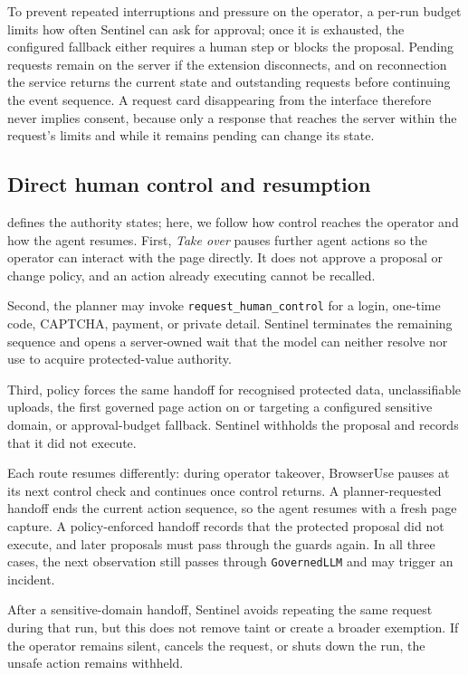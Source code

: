 To prevent repeated interruptions and pressure on the operator, a per-run
budget limits how often Sentinel can ask for approval; once it is exhausted,
the configured fallback either requires a human step or blocks the proposal.
Pending requests remain on the server if the extension disconnects, and on
reconnection the service returns
the current state and outstanding requests before continuing the event sequence.
A request card disappearing from the interface therefore never implies consent,
because only a response that reaches the server within the request's limits and
while it remains pending can change its state.

\subsection{Direct human control and resumption}

 defines the authority states; here, we follow how
control reaches the operator and how the agent resumes. First, \emph{Take over}
pauses further agent actions so the operator can interact with the page directly.
It does not approve a proposal or change policy, and an action already executing
cannot be recalled.

Second, the planner may invoke \texttt{request\_human\_control} for a login,
one-time code, CAPTCHA, payment, or private detail. Sentinel terminates the
remaining sequence and opens a server-owned wait that the model can neither
resolve nor use to acquire protected-value authority.

Third, policy forces the same handoff for recognised protected data,
unclassifiable uploads, the first governed page action on or targeting a
configured sensitive domain, or approval-budget fallback. Sentinel withholds the
proposal and records that it did not execute.

Each route resumes differently: during operator takeover, BrowserUse pauses at
its next control check and continues once control returns. A planner-requested
handoff ends the current action sequence, so the agent resumes with a fresh page
capture. A policy-enforced handoff records that the protected proposal did not
execute, and later proposals must pass through the guards again. In all three
cases, the next observation still passes through \texttt{GovernedLLM} and may
trigger an incident.

After a sensitive-domain handoff, Sentinel avoids repeating the same request
during that run, but this does not remove taint or create a broader exemption.
If the operator remains silent, cancels the request, or shuts down the run, the
unsafe action remains withheld.

